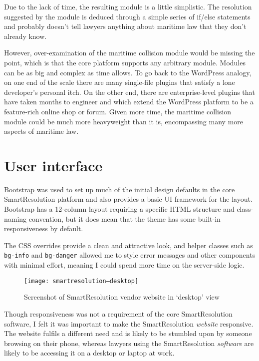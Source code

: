 Due to the lack of time, the resulting module is a little simplistic. The resolution suggested by the module is deduced through a simple series of if/else statements and probably doesn't tell lawyers anything about maritime law that they don't already know.

However, over-examination of the maritime collision module would be missing the point, which is that the core platform supports any arbitrary module. Modules can be as big and complex as time allows. To go back to the WordPress analogy, on one end of the scale there are many single-file plugins that satisfy a lone developer's personal itch. On the other end, there are enterprise-level plugins that have taken months to engineer and which extend the WordPress platform to be a feature-rich online shop or forum. Given more time, the maritime collision module could be much more heavyweight than it is, encompassing many more aspects of maritime law.

\section{User interface}

Bootstrap was used to set up much of the initial design defaults in the core SmartResolution platform and also provides a basic UI framework for the layout. Bootstrap has a 12-column layout requiring a specific HTML structure and class-naming convention, but it does mean that the theme has some built-in responsiveness by default.

The CSS overrides provide a clean and attractive look, and helper classes such as \lstinline{bg-info} and \lstinline{bg-danger} allowed me to style error messages and other components with minimal effort, meaning I could spend more time on the server-side logic.

\begin{figure}[h!]
  \centering
    \ifimages
    \texttt{[image: smartresolution--desktop]}
    \fi
  \caption{Screenshot of SmartResolution vendor website in `desktop' view}
  \label{screenshot:smartresolutionOrg:desktop}
\end{figure}

Though responsiveness was not a requirement of the core SmartResolution software, I felt it was important to make the SmartResolution \emph{website} responsive. The website fulfils a different need and is likely to be stumbled upon by someone browsing on their phone, whereas lawyers using the SmartResolution \emph{software} are likely to be accessing it on a desktop or laptop at work.

